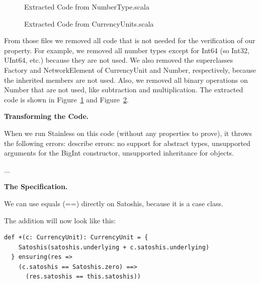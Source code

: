 \documentclass[runningheads]{llncs}
\renewcommand{\paragraph}{\textbf}%
\newcommand{\todo}[1]{{\par \color{red}#1}}
\begin{document}
\begin{figure}

  \caption{Extracted Code from NumberType.scala}
  \label{fig:numbertype}
\end{figure}

\begin{figure}

  \caption{Extracted Code from CurrencyUnits.scala}
  \label{fig:currencyunits}
\end{figure}

From those files we removed all code that is not needed for the
verification of our property.  For example, we removed all number
types except for Int64 (so Int32, UInt64, etc.) because they are not
used. We also removed the superclasses Factory and NetworkElement of
CurrencyUnit and Number, respectively, because the inherited members
are not used. Also, we removed all binary operations on Number that
are not used, like subtraction and multiplication. The extracted code
is shown in Figure~\ref{fig:numbertype} and
Figure~\ref{fig:currencyunits}.


\paragraph{Transforming the Code.}

When we run Stainless on this code (without any properties to prove),
it throws the following errors: describe errors: no support for
  abstract types, unsupported arguments for the BigInt constructor,
  unsupported inheritance for objects.

\todo{...}

\paragraph{The Specification.}

We can use equals (==) directly on Satoshis, because it is a case class.

The addition will now look like this:
\begin{lstlisting}[style=scala]
  def +(c: CurrencyUnit): CurrencyUnit = {
    Satoshis(satoshis.underlying + c.satoshis.underlying)
  } ensuring(res =>
    (c.satoshis == Satoshis.zero) ==>
      (res.satoshis == this.satoshis))
\end{lstlisting}
\end{document}
